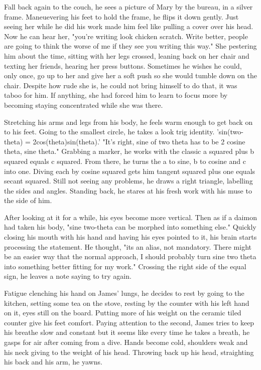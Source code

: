         Fall back again to the couch, he sees a picture of Mary by the bureau, in a silver frame. Maneuevering his feet to hold the frame, he
    flips it down gently. Just seeing her while he did his work made him feel like pulling a cover over his head. Now he can hear her, "you're
    writing look chicken scratch. Write better, people are going to think the worse of me if they see you writing this way." She pestering
    him about the time, sitting with her legs crossed, leaning back on her chair and texting her friends, hearing her press buttons. Sometimes
    he wishes he could, only once, go up to her and give her a soft push so she would tumble down on the chair. Despite how rude she is, he could
    not bring himself to do that, it was taboo for him. If anything, she had forced him to learn to focus more by becoming staying concentrated
    while she was there.

        Stretching his arms and legs from his body, he feels warm enough to get back on to his feet. Going to the smallest circle, he takes
    a look trig identity. 'sin(two-theta) = 2cos(theta)sin(theta).' "It's right, sine of two theta has to be 2 cosine theta, sine theta." Grabbing
    a marker, he works with the classic a squared plus b squared equals c squared. From there, he turns the a to sine, b to cosine and c into one.
    Diving each by cosine squared gets him tangent squared plus one equals secant squared. Still not seeing any problems, he draws a right 
    triangle, labelling the sides and angles. Standing back, he stares at his fresh work with his muse to the side of him. 

        After looking at it for a while, his eyes become more vertical. Then as if a daimon had taken his body, "sine two-theta can be morphed
    into something else." Quickly closing his mouth with his hand and having his eyes pointed to it, his brain starts processing the statement.
    He thought, "its an alias, not mandatory. There might be an easier way that the normal approach, I should probably turn sine two theta into
    something better fitting for my work." Crossing the right side of the equal sign, he leaves a note saying to try again.

        Fatigue clenching his hand on James' lungs, he decides to rest by going to the kitchen, setting some tea on the stove, resting by the
    counter with his left hand on it, eyes still on the board. Putting more of his weight on the ceramic tiled counter give his feet comfort.
    Paying attention to the second, James tries to keep his breathe slow and constant but it seems like every time he takes a breath, he gasps
    for air after coming from a dive. Hands become cold, shoulders weak and his neck giving to the weight of his head. Throwing back up his head,
    straighting his back and his arm, he yawns.

